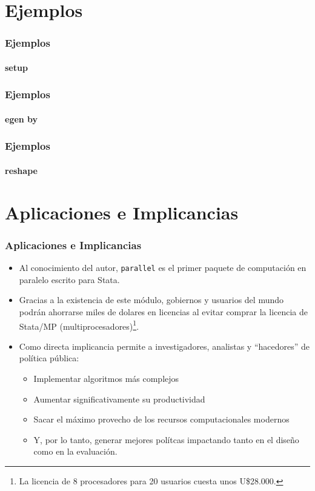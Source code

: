 \documentclass{beamer}
\begin{document}
\section{Ejemplos}

\begin{frame}
\frametitle{Ejemplos}\framesubtitle{setup}

\end{frame}

\begin{frame}
\frametitle{Ejemplos}\framesubtitle{egen by}
\footnotesize

\end{frame}

\begin{frame}[allowframebreaks=1]
\frametitle{Ejemplos}\framesubtitle{reshape}

\end{frame}

\section{Aplicaciones e Implicancias}

\begin{frame}
\frametitle{Aplicaciones e Implicancias}

\begin{itemize}
\item Al conocimiento del autor, {\tt parallel} es el primer paquete de computaci\'on en paralelo escrito para Stata.
\item Gracias a la existencia de este m\'odulo, gobiernos y usuarios del mundo podr\'an ahorrarse miles de dolares en licencias al evitar comprar la licencia de Stata/MP (multiprocesadores)\footnote{La licencia de 8 procesadores para 20 usuarios cuesta unos U\$28.000.}.
\item Como directa implicancia permite a investigadores, analistas y ``hacedores'' de pol\'itica p\'ublica:
\begin{itemize}
\item Implementar algoritmos m\'as complejos
\item Aumentar significativamente su productividad
\item Sacar el m\'aximo provecho de los recursos computacionales modernos
\item Y, por lo tanto, generar mejores pol\'itcas impactando tanto en el dise\~no como en la evaluaci\'on.
\end{itemize}
\end{itemize}

\end{frame}

\frame{\maketitle}
\end{document}
